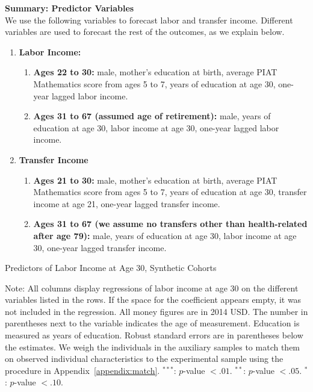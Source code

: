 \noindent \textbf{Summary: Predictor Variables}\\
\noindent We use the following variables to forecast labor and transfer income. Different variables are used to forecast the rest of the outcomes, as we explain below.
\begin{enumerate}
\item \textbf{Labor Income:}
\begin{enumerate}
\item \textbf{Ages 22 to 30:} male, mother's education at birth, average PIAT Mathematics score from ages 5 to 7, years of education at age 30, one-year lagged labor income.
\item \textbf{Ages 31 to 67 (assumed age of retirement):} male, years of education at age 30, labor income at age 30, one-year lagged labor income.
\end{enumerate}
\item \textbf{Transfer Income}
\begin{enumerate}
\item \textbf{Ages 21 to 30:} male, mother's education at birth, average PIAT Mathematics score from ages 5 to 7, years of education at age 30, transfer income at age 21, one-year lagged transfer income.
\item \textbf{Ages 31 to 67 (we assume no transfers other than health-related after age 79):} male, years of education at age 30, labor income at age 30, one-year lagged transfer income.
\end{enumerate}
\end{enumerate}

\begin{table}[H]
\begin{threeparttable}
\caption{Predictors of Labor Income at Age 30, Synthetic Cohorts}
\label{table:predlaborincome}
\centering
\footnotesize

\begin{tablenotes}
\footnotesize
\item Note: All columns display regressions of labor income at age 30 on the different variables listed in the rows. If the space for the coefficient appears empty, it was not included in the regression. All money figures are in 2014 USD. The number in parentheses next to the variable indicates the age of measurement. Education is measured as years of education. Robust standard errors are in parentheses below the estimates. We weigh the individuals in the auxiliary samples to match them on observed individual characteristics to the experimental sample using the procedure in Appendix~\ref{appendix:match}. $^{***}$: $p$-value $< .01$. $^{**}$: $p$-value $< .05$. $^{*}$: $p$-value $< .10$.
\end{tablenotes}
\end{threeparttable}
\end{table}

